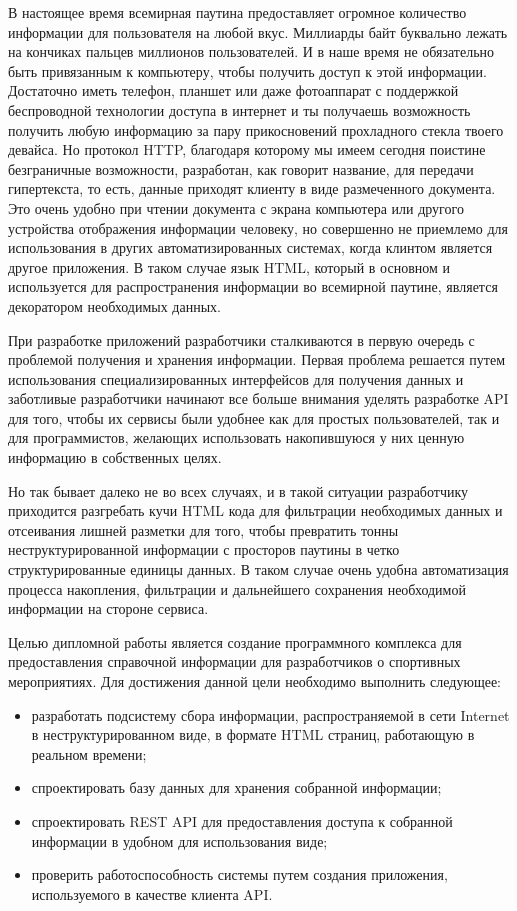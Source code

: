 \Introduction

В настоящее время всемирная паутина предоставляет огромное количество информации для пользователя на любой вкус. Миллиарды байт буквально лежать на кончиках пальцев миллионов пользователей. И в наше время не обязательно быть привязанным к компьютеру, чтобы получить доступ к этой информации. Достаточно иметь телефон, планшет или даже фотоаппарат с поддержкой беспроводной технологии доступа в интернет и ты получаешь возможность получить любую информацию за пару прикосновений прохладного стекла твоего девайса. Но протокол HTTP, благодаря которому мы имеем сегодня поистине безграничные возможности, разработан, как говорит название, для передачи гипертекста, то есть, данные приходят клиенту в виде размеченного документа. Это очень удобно при чтении документа с экрана компьютера или другого устройства отображения информации человеку, но совершенно не приемлемо для использования в других автоматизированных системах, когда клинтом является другое приложения. В таком случае язык HTML, который в основном и используется для распространения информации во всемирной паутине, является декоратором необходимых данных. 

При разработке приложений разработчики сталкиваются в первую очередь с проблемой получения и хранения информации. Первая проблема решается путем использования специализированных интерфейсов для получения данных и заботливые разработчики начинают все больше внимания уделять разработке API для того, чтобы их сервисы были удобнее как для простых пользователей, так и для программистов, желающих использовать накопившуюся у них ценную информацию в собственных целях.

Но так бывает далеко не во всех случаях, и в такой ситуации разработчику приходится разгребать кучи HTML кода для фильтрации необходимых данных и отсеивания лишней разметки для того, чтобы превратить тонны неструктурированной информации с просторов паутины в четко структурированные единицы данных. В таком случае очень удобна автоматизация процесса накопления, фильтрации и дальнейшего сохранения необходимой информации на стороне сервиса. 

Целью дипломной работы является создание программного комплекса для предоставления справочной информации для разработчиков о спортивных мероприятиях. Для достижения данной цели необходимо выполнить следующее: 

\begin{itemize}
\item разработать подсистему сбора информации, распространяемой в сети Internet в неструктурированном виде, в формате HTML страниц, работающую в реальном времени;
\item спроектировать базу данных для хранения собранной информации;
\item спроектировать REST API для предоставления доступа к собранной информации в удобном для использования виде;
\item проверить работоспособность системы путем создания приложения, используемого в качестве клиента API.
\end{itemize}

